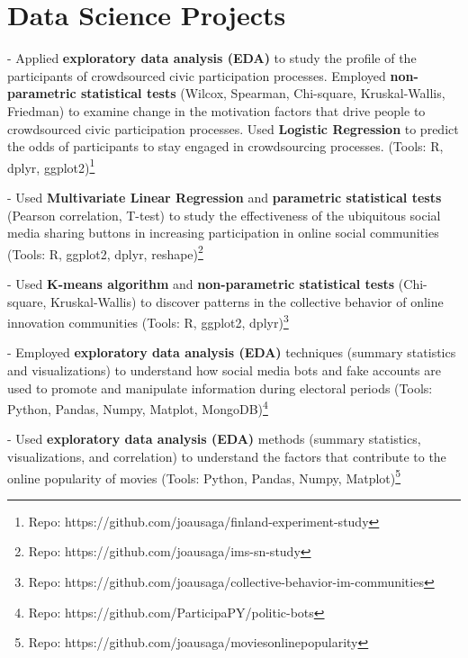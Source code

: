 
\section{Data Science Projects}

-  Applied \textbf{exploratory data analysis (EDA)} to study the profile of the participants of crowdsourced civic participation processes. Employed \textbf{non-parametric statistical tests} (Wilcox, Spearman, Chi-square, Kruskal-Wallis, Friedman) to examine change in the motivation factors that drive people to crowdsourced civic participation processes. Used \textbf{Logistic Regression} to predict the odds of participants to stay engaged in crowdsourcing processes. (Tools: R, dplyr, ggplot2)\footnote{Repo: https://github.com/joausaga/finland-experiment-study}

-  Used \textbf{Multivariate Linear Regression} and \textbf{parametric statistical tests} (Pearson correlation, T-test) to study the effectiveness of the ubiquitous social media sharing buttons in increasing participation in online social communities (Tools: R, ggplot2, dplyr, reshape)\footnote{Repo: https://github.com/joausaga/ims-sn-study}

-  Used \textbf{K-means algorithm} and \textbf{non-parametric statistical tests} (Chi-square, Kruskal-Wallis) to discover patterns in the collective behavior of online innovation communities (Tools: R, ggplot2, dplyr)\footnote{Repo: https://github.com/joausaga/collective-behavior-im-communities}

-  Employed \textbf{exploratory data analysis (EDA)} techniques (summary statistics and visualizations) to understand how social media bots and fake accounts are used to promote and manipulate information during electoral periods (Tools: Python, Pandas, Numpy, Matplot, MongoDB)\footnote{Repo: https://github.com/ParticipaPY/politic-bots}



-  Used \textbf{exploratory data analysis (EDA)} methods (summary statistics, visualizations, and correlation) to understand the factors that contribute to the online popularity of movies (Tools: Python, Pandas, Numpy, Matplot)\footnote{Repo: https://github.com/joausaga/moviesonlinepopularity}


